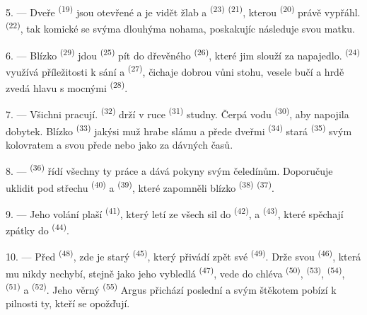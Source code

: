 \VUsaut{3.0mm}

5. --- Dveře  \textsuperscript{(19)} jsou otevřené a je vidět žlab a
 \textsuperscript{(23)}  \textsuperscript{(21)},
kterou  \textsuperscript{(20)} právě vypřáhl. 
\textsuperscript{(22)}, tak komické se svýma dlouhýma nohama, poskakujíc následuje svou
matku.

6. --- Blízko  \textsuperscript{(29)} jdou 
\textsuperscript{(25)} pít do dřevěného  \textsuperscript{(26)}, které
jim slouží za napajedlo.  \textsuperscript{(24)} využívá příležitosti k
sání a  \textsuperscript{(27)}, čichaje dobrou vůni stohu, vesele bučí a
hrdě zvedá hlavu s mocnými  \textsuperscript{(28)}.

7. --- Všichni pracují.  \textsuperscript{(32)} drží v ruce
 \textsuperscript{(31)} studny. Čerpá vodu 
\textsuperscript{(30)}, aby napojila dobytek. Blízko 
\textsuperscript{(33)} jakýsi muž hrabe slámu a přede dveřmi 
\textsuperscript{(34)} stará  \textsuperscript{(35)} svým kolovratem
a svou  přede  nebo  jako za dávných časů.

\VUsaut{3.0mm}
\VUsaut{3.0mm}

8. ---  \textsuperscript{(36)} řídí všechny ty práce a dává pokyny svým
čeledínům. Doporučuje uklidit pod střechu  \textsuperscript{(40)} a
 \textsuperscript{(39)}, které zapomněli blízko 
\textsuperscript{(38)}  \textsuperscript{(37)}.

9. --- Jeho volání plaší  \textsuperscript{(41)}, který letí ze všech
sil do  \textsuperscript{(42)}, a 
\textsuperscript{(43)}, které spěchají zpátky do 
\textsuperscript{(44)}.

10. --- Před  \textsuperscript{(48)}, zde je starý 
\textsuperscript{(45)}, který přivádí zpět své  \textsuperscript{(49)}.
Drže svou  \textsuperscript{(46)}, která mu nikdy nechybí, stejně jako jeho
vybledlá  \textsuperscript{(47)}, vede do chléva 
\textsuperscript{(50)},  \textsuperscript{(53)}, 
\textsuperscript{(54)},  \textsuperscript{(51)} a 
\textsuperscript{(52)}. Jeho věrný  \textsuperscript{(55)} Argus přichází
poslední a svým štěkotem pobízí k pilnosti ty, kteří se opožďují.

